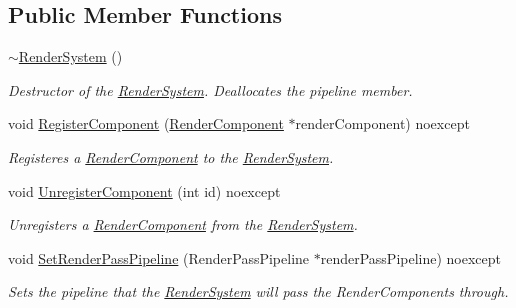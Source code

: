 \subsection*{Public Member Functions}
\begin{DoxyCompactItemize}
\item 
\mbox{\label{class_blade_1_1_render_system_a97b0fa28dab28db46175ceb47b229c13}} 
\hyperlink{class_blade_1_1_render_system_a97b0fa28dab28db46175ceb47b229c13}{$\sim$\+Render\+System} ()
\begin{DoxyCompactList}\small\item\em Destructor of the \hyperlink{class_blade_1_1_render_system}{Render\+System}. Deallocates the pipeline member. \end{DoxyCompactList}\item 
void \hyperlink{class_blade_1_1_render_system_a36ad263f137b6634542966dea0229047}{Register\+Component} (\hyperlink{class_blade_1_1_render_component}{Render\+Component} $\ast$render\+Component) noexcept
\begin{DoxyCompactList}\small\item\em Registeres a \hyperlink{class_blade_1_1_render_component}{Render\+Component} to the \hyperlink{class_blade_1_1_render_system}{Render\+System}. \end{DoxyCompactList}\item 
void \hyperlink{class_blade_1_1_render_system_afaaca8d329f9fa9903a28202959f8958}{Unregister\+Component} (int id) noexcept
\begin{DoxyCompactList}\small\item\em Unregisters a \hyperlink{class_blade_1_1_render_component}{Render\+Component} from the \hyperlink{class_blade_1_1_render_system}{Render\+System}. \end{DoxyCompactList}\item 
void \hyperlink{class_blade_1_1_render_system_a3d760ee1b6c5b4e6f9ec0892d948b91c}{Set\+Render\+Pass\+Pipeline} (Render\+Pass\+Pipeline $\ast$render\+Pass\+Pipeline) noexcept
\begin{DoxyCompactList}\small\item\em Sets the pipeline that the \hyperlink{class_blade_1_1_render_system}{Render\+System} will pass the Render\+Components through. \end{DoxyCompactList}\item 
\mbox{\label{class_blade_1_1_render_system_a8f09fc8598972eacddd158fc14fc3cde}} 

\end{DoxyCompactItemize}
